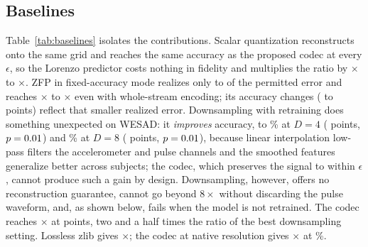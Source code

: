 \documentclass[journal,twoside,web]{ieeecolor}
\begin{document}
\subsection{Baselines}
Table~\ref{tab:baselines} isolates the contributions. Scalar quantization reconstructs onto the same grid and reaches the same accuracy as the proposed codec at every $\epsilon$, so the Lorenzo predictor costs nothing in fidelity and multiplies the ratio by \predGainMin$\times$ to \predGainMax$\times$. ZFP in fixed-accuracy mode realizes only \zfpErrMin{} to \zfpErrMax{} of the permitted error and reaches \zfpRatioMin$\times$ to \zfpRatioMax$\times$ even with whole-stream encoding; its accuracy changes (\zfpDAccMin{} to \zfpDAccMax{} points) reflect that smaller realized error. Downsampling with retraining does something unexpected on WESAD: it \emph{improves} accuracy, to \dsAccC\% at $D=4$ (\dsDAccC{} points, $p=0.01$) and \dsAccE\% at $D=8$ (\dsDAccE{} points, $p=0.01$), because linear interpolation low-pass filters the accelerometer and pulse channels and the smoothed features generalize better across subjects; the codec, which preserves the signal to within $\epsilon$, cannot produce such a gain by design. Downsampling, however, offers no reconstruction guarantee, cannot go beyond $8\times$ without discarding the pulse waveform, and, as shown below, fails when the model is not retrained. The codec reaches \ratioEe$\times$ at \dAccEe{} points, two and a half times the ratio of the best downsampling setting. Lossless zlib gives \ratioLossless$\times$; the codec at native resolution gives \ratioNative$\times$ at \accNative\%.
\end{document}
